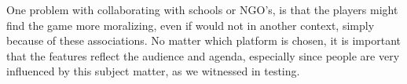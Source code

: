 One problem with collaborating with schools or NGO's, is that the players might find the game more moralizing, even if would not in another context, simply because of these associations. No matter which platform is chosen, it is important that the features reflect the audience and agenda, especially since people are very influenced by this subject matter, as we witnessed in testing.\